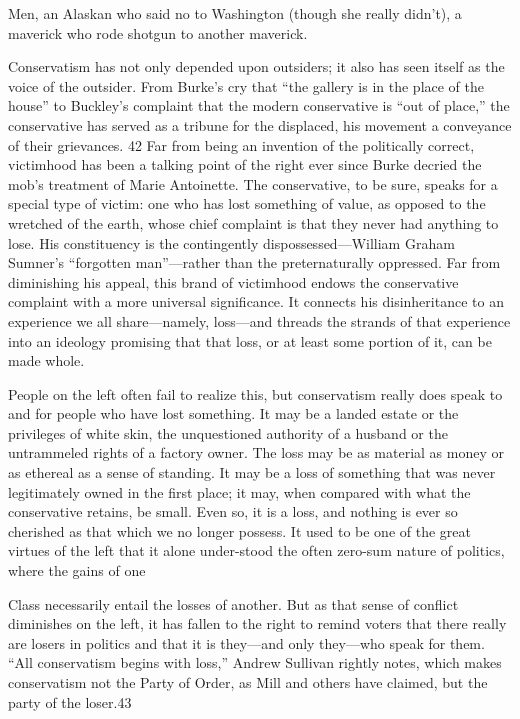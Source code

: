  \par 
Men, an Alaskan who said no to Washington (though she really didn’t), a maverick who rode shotgun to another maverick.
 \par 
Conservatism has not only depended upon outsiders; it also has seen itself as the voice of the outsider. From Burke’s cry that “the gallery is in the place of the house” to Buckley’s complaint that the modern conservative is “out of place,” the conservative has served as a tribune for the displaced, his movement a conveyance of their grievances. {\color{blue}42} Far from being an invention of the politically correct, victimhood has been a talking point of the right ever since Burke decried the mob’s treatment of Marie Antoinette. The conservative, to be sure, speaks for a special type of victim: one who has lost something of value, as opposed to the wretched of the earth, whose chief complaint is that they never had anything to lose. His constituency is the contingently dispossessed—William Graham Sumner’s “forgotten man”—rather than the preternaturally oppressed. Far from diminishing his appeal, this brand of victimhood endows the conservative complaint with a more universal significance. It connects his disinheritance to an experience we all share—namely, loss—and threads the strands of that experience into an ideology promising that that loss, or at least some portion of it, can be made whole.
 \par 
People on the left often fail to realize this, but conservatism really does speak to and for people who have lost something. It may be a landed estate or the privileges of white skin, the unquestioned authority of a husband or the untrammeled rights of a factory owner. The loss may be as material as money or as ethereal as a sense of standing. It may be a loss of something that was never legitimately owned in the first place; it may, when compared with what the conservative retains, be small. Even so, it is a loss, and nothing is ever so cherished as that which we no longer possess. It used to be one of the great virtues of the left that it alone under-stood the often zero-sum nature of politics, where the gains of one
 \par 
Class necessarily entail the losses of another. But as that sense of conflict diminishes on the left, it has fallen to the right to remind voters that there really are losers in politics and that it is they—and only they—who speak for them. “All conservatism begins with loss,” Andrew Sullivan rightly notes, which makes conservatism not the Party of Order, as Mill and others have claimed, but the party of the loser.{\color{blue}43}
